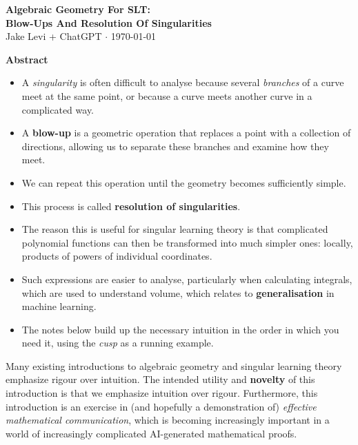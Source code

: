 \documentclass[12pt]{article}
\begin{document}
\begin{center}
    \LARGE
    \setlength{\baselineskip}{1.4em}
    \textbf{Algebraic Geometry For SLT: \\ Blow-Ups And Resolution Of Singularities} \\
    \vspace{12pt}
    \normalsize
    Jake Levi + ChatGPT $\cdot$ \today
\end{center}
\vfill
\begin{center}
    \large\textbf{Abstract}
\end{center}
\vspace{0.5em}
\begin{itemize}
    \item A \emph{singularity} is often difficult to analyse because several \emph{branches} of a curve meet at the same point, or because a curve meets another curve in a complicated way.
    \item A \textbf{blow-up} is a geometric operation that replaces a point with a collection of directions, allowing us to separate these branches and examine how they meet.
    \item We can repeat this operation until the geometry becomes sufficiently simple.
    \item This process is called \textbf{resolution of singularities}.
    \item The reason this is useful for singular learning theory is that complicated polynomial functions can then be transformed into much simpler ones: locally, products of powers of individual coordinates.
    \item Such expressions are easier to analyse, particularly when calculating integrals, which are used to understand volume, which relates to \textbf{generalisation} in machine learning.
    \item The notes below build up the necessary intuition in the order in which you need it, using the \emph{cusp} as a running example.
\end{itemize}

Many existing introductions to algebraic geometry and singular learning theory emphasize rigour over intuition. The intended utility and \textbf{novelty} of this introduction is that we emphasize intuition over rigour. Furthermore, this introduction is an exercise in (and hopefully a demonstration of) \emph{effective mathematical communication}, which is becoming increasingly important in a world of increasingly complicated AI-generated mathematical proofs.
\end{document}
